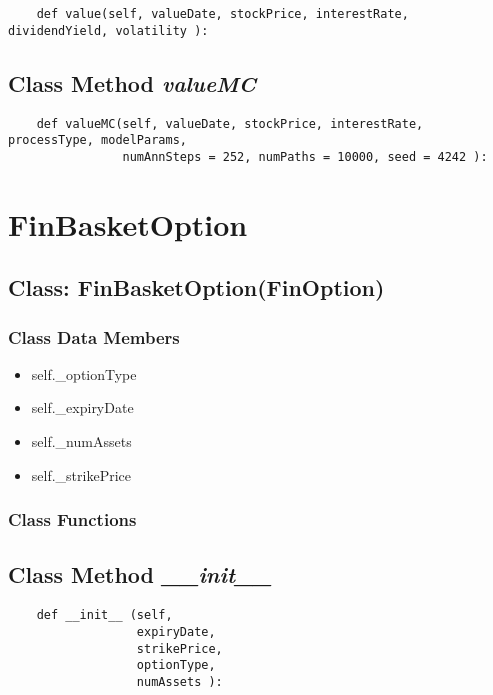 \documentclass[twoside,11pt]{book}
\begin{document}
\begin{lstlisting}
    def value(self, valueDate, stockPrice, interestRate, dividendYield, volatility ):
\end{lstlisting}

\subsection{Class Method {\it valueMC}}


\begin{lstlisting}
    def valueMC(self, valueDate, stockPrice, interestRate, processType, modelParams, 
                numAnnSteps = 252, numPaths = 10000, seed = 4242 ):
\end{lstlisting}

\newpage
\section{FinBasketOption}

\subsection{Class: FinBasketOption(FinOption)}


\subsubsection{Class Data Members}
\begin{itemize}
\item{self.\_optionType}
\item{self.\_expiryDate}
\item{self.\_numAssets}
\item{self.\_strikePrice}
\end{itemize}

\subsubsection{Class Functions}

\subsection{Class Method {\it \_\_init\_\_ }}


\begin{lstlisting}
    def __init__ (self,
                  expiryDate,
                  strikePrice,
                  optionType,
                  numAssets ):
\end{lstlisting}
\end{document}
